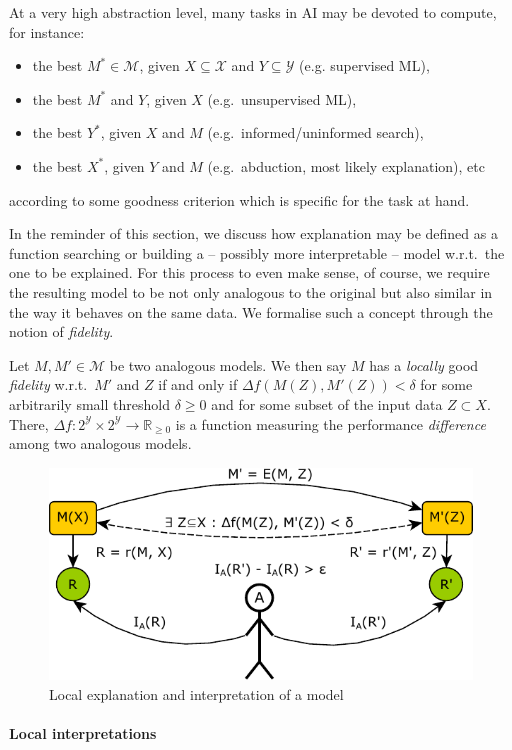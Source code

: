 \documentclass[12pt,a4paper,openright,twoside]{book}
\begin{document}
At a very high abstraction level, many tasks in AI may be devoted to compute, for instance:
%
\begin{itemize}
    \item the best $M^* \in \mathcal{M}$, given $X \subseteq \mathcal{X}$ and $Y \subseteq \mathcal{Y}$ (e.g. supervised ML),
    \item the best $M^*$ and $Y$, given $X$ (e.g.\ unsupervised ML),
    \item the best $Y^*$, given $X$ and $M$ (e.g.\ informed/uninformed search),
    \item the best $X^*$, given $Y$ and $M$ (e.g.\  abduction, most likely explanation), etc
\end{itemize}
%
according to some goodness criterion which is specific for the task at hand.

In the reminder of this section, we discuss how explanation may be defined as a function searching or building a -- possibly more interpretable -- model w.r.t.\ the one to be explained.
%
For this process to even make sense, of course, we require the resulting model to be not only analogous to the original but also similar in the way it behaves on the same data.
%
We formalise such a concept through the notion of \emph{fidelity}.

Let $M, M' \in \mathcal{M}$ be two analogous models.
%
We then say $M$ has a \emph{locally} good \emph{fidelity} w.r.t.\ $M'$ and $Z$ if and only if $\Delta f(M(Z), M'(Z)) < \delta$ for some arbitrarily small threshold $\delta \geq 0$ and for some subset of the input data $Z \subset X$.
%
There, $\Delta f : 2^\mathcal{Y} \times 2^\mathcal{Y} \rightarrow \mathbb{R}_{\geq 0}$ is a function measuring the performance \emph{difference} among two analogous models.

\begin{figure}
    \centering
    \includegraphics[width=.5\linewidth]{figures/local.pdf}
    \caption{Local explanation and interpretation of a model}
    \label{fig:local}
\end{figure}

\paragraph{Local interpretations}
\end{document}
